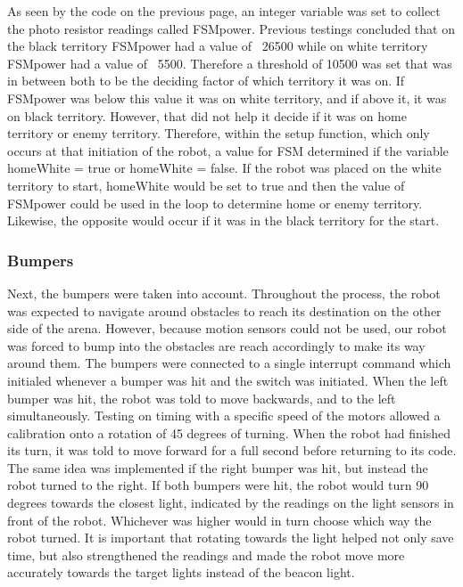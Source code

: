 \documentclass{article}
\begin{document}
    As seen by the code on the previous page, an integer variable was set to collect the photo resistor readings called FSMpower. Previous testings concluded that on the black territory FSMpower had a value of ~26500 while on white territory FSMpower had a value of ~5500. Therefore a threshold of 10500 was set that was in between both to be the deciding factor of which territory it was on. If FSMpower was below this value it was on white territory, and if above it, it was on black territory. However, that did not help it decide if it was on home territory or enemy territory. Therefore, within the setup function, which only occurs at that initiation of the robot, a value for FSM determined if the variable homeWhite = true or homeWhite = false. If the robot was placed on the white territory to start, homeWhite would be set to true and then the value of FSMpower could be used in the loop to determine home or enemy territory. Likewise, the opposite would occur if it was in the black territory for the start.
    
    \subsubsection{Bumpers}
    Next, the bumpers were taken into account. Throughout the process, the robot was expected to navigate around obstacles to reach its destination on the other side of the arena. However, because motion sensors could not be used, our robot was forced to bump into the obstacles are reach accordingly to make its way around them. The bumpers were connected to a single interrupt command which initialed whenever a bumper was hit and the switch was initiated. When the left bumper was hit, the robot was told to move backwards, and to the left simultaneously. Testing on timing with a specific speed of the motors allowed a calibration onto a rotation of 45 degrees of turning. When the robot had finished its turn, it was told to move forward for a full second before returning to its code. The same idea was implemented if the right bumper was hit, but instead the robot turned to the right. If both bumpers were hit, the robot would turn 90 degrees towards the closest light, indicated by the readings on the light sensors in front of the robot. Whichever was higher would in turn choose which way the robot turned. It is important that rotating towards the light helped not only save time, but also strengthened the readings and made the robot move more accurately towards the target lights instead of the beacon light.\\
    
\end{document}

